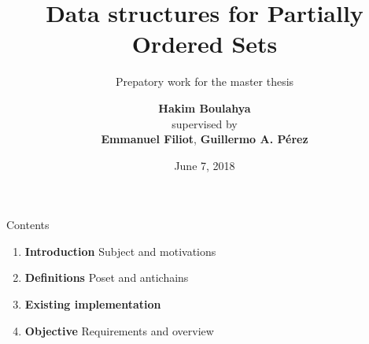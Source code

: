 \documentclass[11pt]{beamer}
\title{Data structures for Partially Ordered Sets}  %
\subtitle{Prepatory work for the master thesis}
\date{June 7, 2018}
\author{
  \textbf{Hakim Boulahya}\\
  \small supervised by\\
  \small \textbf{Emmanuel Filiot},
  \textbf{Guillermo A. Pérez}
}
\institute[
  Faculty of Science
  Université Libre de Bruxelles
  Belgium
] %
{%
  Département d'Informatique \\
  Université Libre de Bruxelles \\
  Belgium

}
\begin{document}
{\aauwavesbg%
\begin{frame} %
  \titlepage
\end{frame}}

\begin{frame}{Contents}{}

\begin{block}{}
  \begin{enumerate}
    \item \textcolor{firstcolor}{\textbf{Introduction}}
     Subject and motivations
    \item \textcolor{firstcolor}{\textbf{Definitions}}
     Poset and antichains
     \item \textcolor{firstcolor}{\textbf{Existing implementation}}
    \item \textcolor{firstcolor}{\textbf{Objective}}
     Requirements and overview
  \end{enumerate}
\end{block}

\end{frame}

\end{document}
